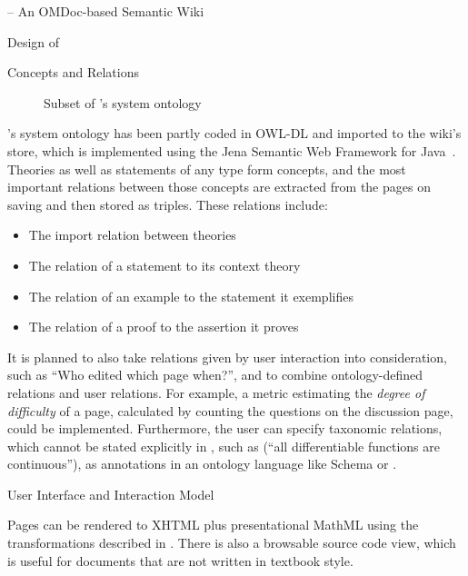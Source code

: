 \begin{omgroup}[id=swim,creators={clange,miko}]{{\swim} -- An OMDoc-based Semantic Wiki}
\begin{omgroup}{Design of {\swim}}
\begin{omgroup}{Concepts and Relations}
\begin{wrapfigure}{r}{8cm}
  \caption{Subset of {\omdoc}'s system ontology}\vspace*{-.5cm}
\end{wrapfigure}
{\omdoc}'s system ontology has been partly coded in OWL-DL and imported to the wiki's {\rdf}
store, which is implemented using the Jena Semantic Web Framework for
Java~\cite{URL:jena:web}. Theories as well as statements of any type form concepts, and
the most important relations between those concepts are extracted from the {\omdoc} pages
on saving and then stored as {\rdf} triples.  These relations include:
\begin{itemize}
\item The import relation between theories
\item The relation of a statement to its context theory
\item The relation of an example to the statement it exemplifies
\item The relation of a proof to the assertion it proves
\end{itemize}
It is planned to also take relations given by user interaction into consideration, such as
``Who edited which page when?'', and to combine ontology-defined relations and user
relations.  For example, a metric estimating the {\emph{degree of difficulty}} of a page,
calculated by counting the questions on the discussion page, could be implemented.
Furthermore, the user can specify taxonomic relations, which cannot be stated explicitly
in {\omdoc}, such as (``all differentiable functions are continuous''), as annotations in
an ontology language like {\rdf} Schema or {\owl}.
\end{omgroup}

\begin{omgroup}{User Interface and Interaction Model}

  Pages can be rendered to XHTML plus presentational MathML using the transformations
  described in {}. There is also a browsable source code
  view, which is useful for documents that are not written in textbook style.


\end{omgroup}
\end{omgroup}
\end{omgroup}
